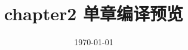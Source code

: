 \documentclass[UTF8,zihao=-4,openany]{ctexbook}
\begin{document}
\frontmatter
\title{chapter2 单章编译预览}
\author{ }
\date{\today}
\maketitle
\tableofcontents
\mainmatter
\setcounter{chapter}{1}

\printbibliography
\end{document}
